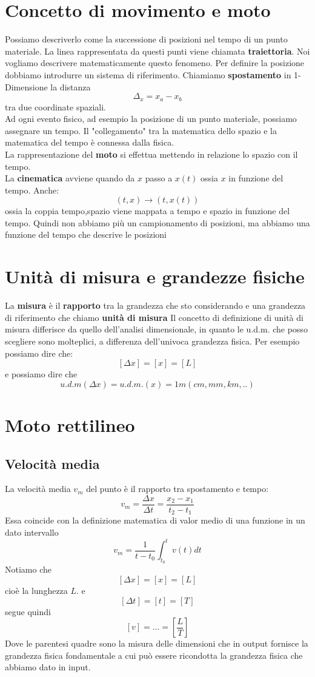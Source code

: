 \documentclass[a4paper]{report}
\begin{document}
  \section{Concetto di movimento e moto}
  Possiamo descriverlo come la successione di posizioni nel tempo di un punto materiale. La linea rappresentata da questi punti viene chiamata \textbf{traiettoria}. Noi vogliamo descrivere matematicamente questo fenomeno.
  Per definire la posizione dobbiamo introdurre un sistema di riferimento.
  Chiamiamo \textbf{spostamento} in 1-Dimensione la distanza $$\Delta_x = x_a -x_b$$ tra due coordinate spaziali.\\
  Ad ogni evento fisico, ad esempio la posizione di un punto materiale, possiamo assegnare un tempo. Il "collegamento" tra la matematica dello spazio e la matematica del tempo è connessa dalla fisica.\\
  La rappresentazione del \textbf{moto} si effettua mettendo in relazione lo spazio con il tempo.\\
  La \textbf{cinematica} avviene quando da $x$ passo a $x(t)$ ossia $x$ in funzione del tempo. Anche: $$(t,x) \rightarrow (t, x(t))$$ ossia la coppia tempo,spazio viene mappata a tempo e spazio in funzione del tempo. Quindi non abbiamo più un campionamento di posizioni, ma abbiamo una funzione del tempo che descrive le posizioni

  \section{Unità di misura e grandezze fisiche}
  La \textbf{misura} è il \textbf{rapporto} tra la grandezza che sto considerando e una grandezza di riferimento che chiamo \textbf{unità di misura}
  Il concetto di definizione di unità di misura differisce da quello dell'analisi dimensionale, in quanto le u.d.m. che posso scegliere sono molteplici, a differenza dell'univoca grandezza fisica.
  Per esempio possiamo dire che:
  $$[\Delta x] = [x] = [L]$$
  e possiamo dire che
  $$u.d.m(\Delta x) = u.d.m.(x) = 1m (cm, mm, km, ..)$$

  \section{Moto rettilineo}
  \subsection{Velocità media}
  La velocità media $v_m$ del punto è il rapporto tra spostamento e tempo:
  $$ v_m = \frac{\Delta x}{\Delta t} = \frac{x_2 - x_1}{t_2 - t_1} $$
  Essa coincide con la definizione matematica di valor medio di una funzione in un dato intervallo
  $$ v_m = \frac{1}{t-t_0} \int_{t_0}^t v(t) dt $$
  Notiamo che $$[\Delta x] = [x] = [L]$$ cioè la lunghezza $L$. e
  $$ [\Delta t] = [t] = [T]$$ segue quindi
  $$ [v] = ... = [\frac{L}{T}]$$
  Dove le parentesi quadre sono la misura delle dimensioni che in output fornisce la grandezza fisica fondamentale a cui può essere ricondotta la grandezza fisica che abbiamo dato in input.
\end{document}
